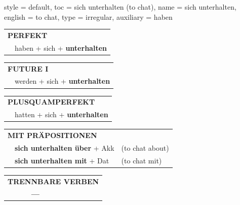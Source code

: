 \begin{verbentry}{
  style = {default},
  toc = {sich unterhalten (to chat)},
  name = {sich unterhalten},
  english = {to chat},
  type = {irregular},
  auxiliary = {haben}
}
 \begin{tabular}{rl}
     \multicolumn{2}{l}{\textbf{PERFEKT}}\\
    &haben + sich + \textbf{unterhalten}\\
  \end{tabular}
\hfill
   \begin{tabular}{rl}
   
    \multicolumn{2}{l}{\textbf{FUTURE I} }\\
    &werden + sich + \textbf{unterhalten}\\
 
  \end{tabular}
\hfill
   \begin{tabular}{rl}
      \multicolumn{2}{l}{\textbf{PLUSQUAMPERFEKT}}\\
    &hatten + sich + \textbf{unterhalten}\\
  \end{tabular}
  
\vspace{10pt}

   \begin{tabular}{lll}
      \multicolumn{3}{l}{\textbf{MIT PRÄPOSITIONEN}}\\
& \textbf{sich unterhalten über} + Akk & (to chat about)\\
& \textbf{sich unterhalten mit} + Dat & (to chat mit)\\
  \end{tabular}
 \hfill
   \begin{tabular}{lll}
\multicolumn{3}{l}{\textbf{TRENNBARE VERBEN}}\\
& \textbf{---} & \\
\end{tabular}
  
  \vspace{-5pt}
\end{verbentry}

